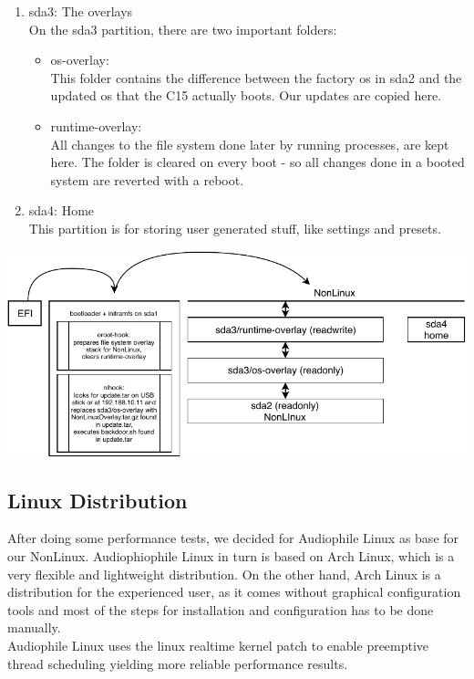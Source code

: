 \documentclass[10pt,a4paper]{article}
\begin{document}
\begin{enumerate}
\item sda3: The overlays\\
On the sda3 partition, there are two important folders: 
\begin{itemize}
\item os-overlay:\\
This folder contains the difference between the factory os in sda2 and the updated os that the C15 actually boots. Our updates are copied here.
\item runtime-overlay:\\
All changes to the file system done later by running processes, are kept here. The folder is cleared on every boot - so all changes done in a booted system are reverted with a reboot.
\end{itemize}
\item sda4: Home\\
This partition is for storing user generated stuff, like settings and presets.
\end{enumerate}

\begin{center}
\includegraphics[scale=1.0]{ePC.pdf}	
\end{center}

\subsection{Linux Distribution}
After doing some performance tests, we decided for Audiophile Linux as base for our NonLinux. Audiophiophile Linux in turn is based on Arch Linux, which is a very flexible and lightweight distribution. On the other hand, Arch Linux is a distribution for the experienced user, as it comes without graphical configuration tools and most of the steps for installation and configuration has to be done manually.\\
Audiophile Linux uses the linux realtime kernel patch to enable preemptive thread scheduling yielding more reliable performance results.\\
\end{document}
